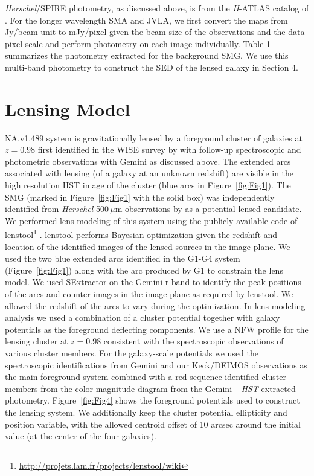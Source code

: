 \documentclass[iop,apj,useAMS,usenatbib]{emulateapj-rtx4}
\begin{document}
{\it Herschel}/SPIRE photometry, as discussed above, is from the
{\it H}-ATLAS catalog of \citet{Valiante2016}. For the longer wavelength
SMA and JVLA, we first convert the maps from Jy/beam unit to mJy/pixel
given the beam size of the observations and the data pixel scale and
perform photometry on each image individually. Table 1 summarizes the
photometry extracted for the background SMG. We use this multi-band
photometry to construct the SED of the lensed galaxy in Section 4. 

\section{Lensing Model}

NA.v1.489 system is gravitationally lensed by a foreground cluster of
galaxies at $z=0.98$ first identified in the WISE survey by
\citet{Stanford2014} with follow-up spectroscopic and photometric
observations with Gemini as discussed above. The extended arcs
associated with lensing (of a galaxy at an unknown redshift) are visible in the high resolution HST
image of the cluster (blue arcs in Figure~\ref{fig:Fig1}). The SMG (marked in
Figure~\ref{fig:Fig1} with the solid box) was
independently identified from {\it Herschel} 500\,$\mu$m observations
by \citet{Negrello2016} as a potential lensed candidate. We performed lens modeling of this system
using the publicly available code of
{\sc lenstool}\footnote{\url{http://projets.lam.fr/projects/lenstool/wiki}}
\citep{Kneib1996, Jullo2007, Jullo2009}. {\sc lenstool} performs
Bayesian optimization given the redshift
and location of the identified images of the lensed sources in the
image plane. We used the two blue extended arcs identified in the
G1-G4 system (Figure~\ref{fig:Fig1}) along with the arc produced by G1 to constrain the
lens model. We used {\sc SExtractor} on the Gemini r-band to
identify the peak positions of the arcs and counter images in the
image plane as required by
{\sc lenstool}. We allowed the redshift of the arcs to vary during
the optimization. In lens modeling analysis we
used a combination of a cluster potential together with galaxy potentials as the
foreground deflecting components. We use a NFW profile
\citep{Navarro1996} for the lensing cluster at $z=0.98$ consistent
with the spectroscopic observations of various cluster members. For
the galaxy-scale potentials we used the spectroscopic identifications
from Gemini \citep{Stanford2014} and our Keck/DEIMOS observations as
the main foreground system combined with a red-sequence identified
cluster members from the color-magnitude diagram from the Gemini+{\it
  HST} extracted photometry. Figure~\ref{fig:Fig4} shows the
foreground potentials used to construct the lensing system. We
additionally keep the cluster potential
ellipticity and position variable, with the allowed centroid offset of
10 arcsec around the initial value (at the center of the four
galaxies). 
\end{document}

